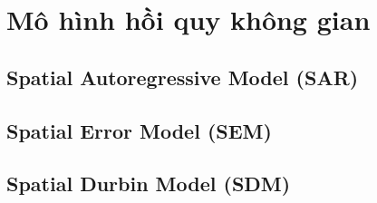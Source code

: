 \chapter{Mô hình hồi quy không gian}
\section{Spatial Autoregressive Model (SAR)}
\section{Spatial Error Model (SEM)}
\section{Spatial Durbin Model (SDM)}